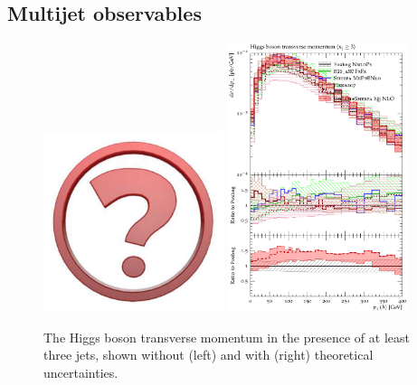 


\clearpage
\subsection{Multijet observables}
\label{sec:hjetscomp:results:mjobs}

\begin{figure}[t!]
  \centering
  \includegraphics[width=0.47\textwidth]{Micon.pdf}
  \hfill
  \includegraphics[width=0.47\textwidth]{figures/hjetscomp_H_jjj_pT_incl.pdf}
  \caption{
    The Higgs boson transverse momentum in the presence of at least three 
    jets, shown without (left) and with (right) theoretical uncertainties.
    \label{fig:higgscomp:results:mobs:hpt_j3}
  }
\end{figure}

